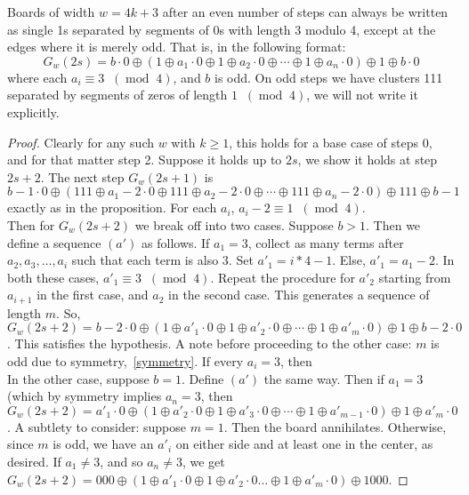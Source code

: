 \documentclass[12pt,letterpaper]{article}
\newcommand{\Mod}[1]{\ensuremath{\;\;(\operatorname{mod}\;#1)}}
\begin{document}
\begin{prop} \label{onesSepByOddZeros} %
  Boards of width $w=4k+3$ after an even number of steps can always be written as single 1s separated by segments of 0s with length 3 modulo 4, except at the edges where it is merely odd. That is, in the following format:
  $$G_w(2s)=b\cdot 0 \oplus (1 \oplus a_1\cdot 0 \oplus 1\oplus a_2\cdot 0\oplus\cdots \oplus 1\oplus a_n\cdot 0) \oplus 1 \oplus b\cdot 0$$
  where each $a_i\equiv 3 \Mod{4}$, and $b$ is odd.
  On odd steps we have clusters 111 separated by segments of zeros of length $1\Mod 4$, we will not write it explicitly.
\end{prop}
\begin{proof}
  Clearly for any such $w$ with $k\geq 1$, this holds for a base case of steps 0, and for that matter step 2. Suppose it holds up to $2s$, we show it holds at step $2s+2$. The next step $G_w(2s+1)$ is $$b-1\cdot 0\oplus (111\oplus a_1-2\cdot 0 \oplus 111\oplus a_2-2\cdot 0\oplus\cdots\oplus 111 \oplus a_n-2\cdot 0)\oplus 111 \oplus b-1$$ exactly as in the proposition. For each $a_i$, $a_i-2\equiv 1 \Mod 4$. \\
  Then for $G_w(2s+2)$ we break off into two cases. Suppose $b>1$. Then we define a sequence $(a')$ as follows. If $a_1=3$, collect as many terms after $a_2,a_3,\dots,a_i$ such that each term is also 3. Set $a'_1=i*4-1$. Else, $a'_1=a_1-2$. In both these cases, $a'_1\equiv 3 \Mod 4$. Repeat the procedure for $a'_2$ starting from $a_{i+1}$ in the first case, and $a_2$ in the second case. This generates a sequence of length $m$. So, $G_w(2s+2) = b-2\cdot 0\oplus (1\oplus a'_1\cdot 0\oplus 1 \oplus a'_2\cdot 0 \oplus\cdots\oplus 1\oplus a'_m\cdot 0)\oplus 1\oplus b-2\cdot 0$. This satisfies the hypothesis. A note before proceeding to the other case: $m$ is odd due to symmetry,~\cref{symmetry}. If every $a_i=3$, then  \\
  In the other case, suppose $b=1$. Define $(a')$ the same way. Then if $a_1=3$ (which by symmetry implies $a_n=3$, then $G_w(2s+2)= a'_1\cdot 0\oplus (1\oplus a'_2\cdot 0\oplus 1\oplus a'_3\cdot 0\oplus\cdots\oplus 1\oplus a'_{m-1}\cdot 0)\oplus 1\oplus a'_m\cdot 0$. A subtlety to consider: suppose $m=1$. Then the board annihilates. Otherwise, since $m$ is odd, we have an $a'_i$ on either side and at least one in the center, as desired. 
  If $a_1\neq 3$, and so $a_n\neq 3$, we get $G_w(2s+2) = 000\oplus(1\oplus a'_1\cdot 0\oplus 1\oplus a'_2\cdot 0\dots\oplus 1\oplus a'_m\cdot 0)\oplus 1000$. 
\end{proof}
\end{document}
